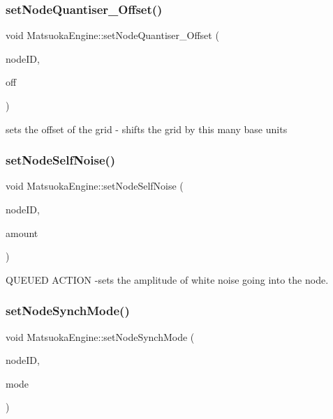 \mbox{\label{classMatsuokaEngine_a12aafa189a6c9302937a00de6d291d42}} 
\subsubsection{\texorpdfstring{set\+Node\+Quantiser\+\_\+\+Offset()}{setNodeQuantiser\_Offset()}}
{\footnotesize\ttfamily void Matsuoka\+Engine\+::set\+Node\+Quantiser\+\_\+\+Offset (\begin{DoxyParamCaption}\item[{unsigned}]{node\+ID,  }\item[{float}]{off }\end{DoxyParamCaption})}



sets the offset of the grid -\/ shifts the grid by this many base units 

\mbox{\label{classMatsuokaEngine_a4e564e80779a3cd89cb3d4347920ba7d}} 
\subsubsection{\texorpdfstring{set\+Node\+Self\+Noise()}{setNodeSelfNoise()}}
{\footnotesize\ttfamily void Matsuoka\+Engine\+::set\+Node\+Self\+Noise (\begin{DoxyParamCaption}\item[{unsigned}]{node\+ID,  }\item[{double}]{amount }\end{DoxyParamCaption})}



Q\+U\+E\+U\+ED A\+C\+T\+I\+ON -\/sets the amplitude of white noise going into the node. 

\mbox{\label{classMatsuokaEngine_aa037d1bcb48e395ef6e789feab20b144}} 
\subsubsection{\texorpdfstring{set\+Node\+Synch\+Mode()}{setNodeSynchMode()}}
{\footnotesize\ttfamily void Matsuoka\+Engine\+::set\+Node\+Synch\+Mode (\begin{DoxyParamCaption}\item[{unsigned}]{node\+ID,  }\item[{\mbox{\hyperlink{classMatsuNode_a725e228db39b8842f851ddf88f640bed}{synch\+Mode}}}]{mode }\end{DoxyParamCaption})}

